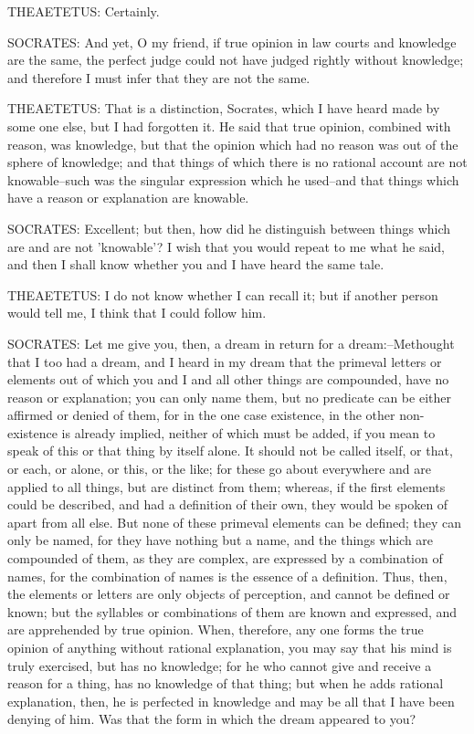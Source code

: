 THEAETETUS: Certainly.

SOCRATES: And yet, O my friend, if true opinion in law courts and
knowledge are the same, the perfect judge could not have judged rightly
without knowledge; and therefore I must infer that they are not the
same.

THEAETETUS: That is a distinction, Socrates, which I have heard made
by some one else, but I had forgotten it. He said that true opinion,
combined with reason, was knowledge, but that the opinion which had
no reason was out of the sphere of knowledge; and that things of which
there is no rational account are not knowable--such was the singular
expression which he used--and that things which have a reason or
explanation are knowable.

SOCRATES: Excellent; but then, how did he distinguish between things
which are and are not 'knowable'? I wish that you would repeat to me
what he said, and then I shall know whether you and I have heard the
same tale.

THEAETETUS: I do not know whether I can recall it; but if another person
would tell me, I think that I could follow him.

SOCRATES: Let me give you, then, a dream in return for a
dream:--Methought that I too had a dream, and I heard in my dream that
the primeval letters or elements out of which you and I and all other
things are compounded, have no reason or explanation; you can only name
them, but no predicate can be either affirmed or denied of them, for in
the one case existence, in the other non-existence is already implied,
neither of which must be added, if you mean to speak of this or that
thing by itself alone. It should not be called itself, or that, or each,
or alone, or this, or the like; for these go about everywhere and are
applied to all things, but are distinct from them; whereas, if the first
elements could be described, and had a definition of their own, they
would be spoken of apart from all else. But none of these primeval
elements can be defined; they can only be named, for they have nothing
but a name, and the things which are compounded of them, as they are
complex, are expressed by a combination of names, for the combination
of names is the essence of a definition. Thus, then, the elements or
letters are only objects of perception, and cannot be defined or known;
but the syllables or combinations of them are known and expressed, and
are apprehended by true opinion. When, therefore, any one forms the true
opinion of anything without rational explanation, you may say that his
mind is truly exercised, but has no knowledge; for he who cannot give
and receive a reason for a thing, has no knowledge of that thing; but
when he adds rational explanation, then, he is perfected in knowledge
and may be all that I have been denying of him. Was that the form in
which the dream appeared to you?


